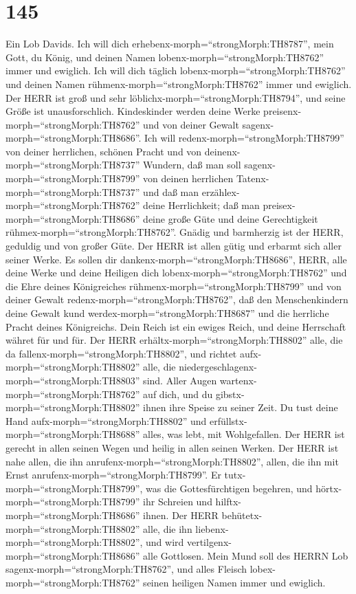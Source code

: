\hypertarget{section-144}{%
\section{145}\label{section-144}}

 Ein Lob Davids. Ich will dich
erhebenx-morph=``strongMorph:TH8787'', mein Gott, du König, und deinen
Namen lobenx-morph=``strongMorph:TH8762'' immer und ewiglich.
 Ich will dich täglich lobenx-morph=``strongMorph:TH8762''
und deinen Namen rühmenx-morph=``strongMorph:TH8762'' immer und
ewiglich.  Der HERR ist groß und sehr
löblichx-morph=``strongMorph:TH8794'', und seine Größe ist
unausforschlich.  Kindeskinder werden deine Werke
preisenx-morph=``strongMorph:TH8762'' und von deiner Gewalt
sagenx-morph=``strongMorph:TH8686''.  Ich will
redenx-morph=``strongMorph:TH8799'' von deiner herrlichen, schönen
Pracht und von deinenx-morph=``strongMorph:TH8737'' Wundern,
 daß man soll sagenx-morph=``strongMorph:TH8799'' von deinen
herrlichen Tatenx-morph=``strongMorph:TH8737'' und daß man
erzählex-morph=``strongMorph:TH8762'' deine Herrlichkeit; 
daß man preisex-morph=``strongMorph:TH8686'' deine große Güte und deine
Gerechtigkeit rühmex-morph=``strongMorph:TH8762''.  Gnädig
und barmherzig ist der HERR, geduldig und von großer Güte. 
Der HERR ist allen gütig und erbarmt sich aller seiner Werke.
 Es sollen dir dankenx-morph=``strongMorph:TH8686'', HERR,
alle deine Werke und deine Heiligen dich
lobenx-morph=``strongMorph:TH8762''  und die Ehre deines
Königreiches rühmenx-morph=``strongMorph:TH8799'' und von deiner Gewalt
redenx-morph=``strongMorph:TH8762'',  daß den
Menschenkindern deine Gewalt kund werdex-morph=``strongMorph:TH8687''
und die herrliche Pracht deines Königreichs.  Dein Reich
ist ein ewiges Reich, und deine Herrschaft währet für und für.
 Der HERR erhältx-morph=``strongMorph:TH8802'' alle, die da
fallenx-morph=``strongMorph:TH8802'', und richtet
aufx-morph=``strongMorph:TH8802'' alle, die
niedergeschlagenx-morph=``strongMorph:TH8803'' sind.  Aller
Augen wartenx-morph=``strongMorph:TH8762'' auf dich, und du
gibstx-morph=``strongMorph:TH8802'' ihnen ihre Speise zu seiner Zeit.
 Du tust deine Hand aufx-morph=``strongMorph:TH8802'' und
erfüllstx-morph=``strongMorph:TH8688'' alles, was lebt, mit
Wohlgefallen.  Der HERR ist gerecht in allen seinen Wegen
und heilig in allen seinen Werken.  Der HERR ist nahe
allen, die ihn anrufenx-morph=``strongMorph:TH8802'', allen, die ihn mit
Ernst anrufenx-morph=``strongMorph:TH8799''.  Er
tutx-morph=``strongMorph:TH8799'', was die Gottesfürchtigen begehren,
und hörtx-morph=``strongMorph:TH8799'' ihr Schreien und
hilftx-morph=``strongMorph:TH8686'' ihnen.  Der HERR
behütetx-morph=``strongMorph:TH8802'' alle, die ihn
liebenx-morph=``strongMorph:TH8802'', und wird
vertilgenx-morph=``strongMorph:TH8686'' alle Gottlosen. 
Mein Mund soll des HERRN Lob sagenx-morph=``strongMorph:TH8762'', und
alles Fleisch lobex-morph=``strongMorph:TH8762'' seinen heiligen Namen
immer und ewiglich.

